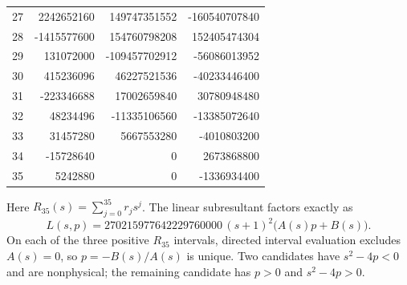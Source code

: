 \begin{longtable}{r|r|r|r}
27 & 2242652160 & 149747351552 & {-}160540707840\\
28 & {-}1415577600 & 154760798208 & 152405474304\\
29 & 131072000 & {-}109457702912 & {-}56086013952\\
30 & 415236096 & 46227521536 & {-}40233446400\\
31 & {-}223346688 & 17002659840 & 30780948480\\
32 & 48234496 & {-}11335106560 & {-}13385072640\\
33 & 31457280 & 5667553280 & {-}4010803200\\
34 & {-}15728640 & 0 & 2673868800\\
35 & 5242880 & 0 & {-}1336934400\\
\end{longtable}
\endgroup
Here $R_{35}(s)=\sum_{j=0}^{35}r_js^j$. The linear subresultant factors exactly as
\[
L(s,p)=270215977642229760000\,(s+1)^{2}\bigl(A(s)p+B(s)\bigr).
\]
On each of the three positive $R_{35}$ intervals, directed interval evaluation excludes $A(s)=0$, so $p=-B(s)/A(s)$ is unique. Two candidates have $s^2-4p<0$ and are nonphysical; the remaining candidate has $p>0$ and $s^2-4p>0$.
